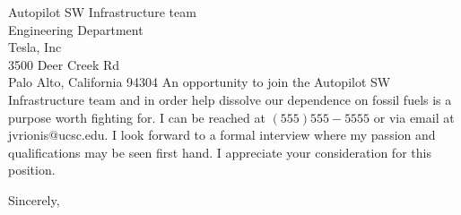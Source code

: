 \documentclass{letter}  %
\begin{document}
\begin{letter}{
Autopilot SW Infrastructure team \\
Engineering Department\\
Tesla, Inc \\
3500 Deer Creek Rd \\
Palo Alto, California 94304 
}
\noindent An opportunity to join the Autopilot SW Infrastructure 
team and in order help dissolve our dependence on fossil fuels 
is a  purpose worth fighting for. I can be reached at 
$(555) 555-5555$ or via email at jvrionis@ucsc.edu. I look 
forward to a formal interview where my passion and qualifications 
may be seen first hand. I appreciate your consideration for this 
position.

\closing{Sincerely,}

\end{letter}
\end{document}
